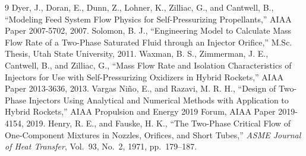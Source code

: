 \documentclass[11pt,a4paper]{article}
\begin{document}
\begin{thebibliography}{9}\footnotesize
{} Dyer, J., Doran, E., Dunn, Z., Lohner, K., Zilliac, G., and Cantwell, B., ``Modeling Feed System Flow Physics for Self-Pressurizing Propellants,'' AIAA Paper 2007-5702, 2007.
 Solomon, B. J., ``Engineering Model to Calculate Mass Flow Rate of a Two-Phase Saturated Fluid through an Injector Orifice,'' M.Sc. Thesis, Utah State University, 2011.
 Waxman, B. S., Zimmerman, J. E., Cantwell, B., and Zilliac, G., ``Mass Flow Rate and Isolation Characteristics of Injectors for Use with Self-Pressurizing Oxidizers in Hybrid Rockets,'' AIAA Paper 2013-3636, 2013.
 Vargas Ni\~no, E., and Razavi, M. R. H., ``Design of Two-Phase Injectors Using Analytical and Numerical Methods with Application to Hybrid Rockets,'' AIAA Propulsion and Energy 2019 Forum, AIAA Paper 2019-4154, 2019.
 Henry, R. E., and Fauske, H. K., ``The Two-Phase Critical Flow of One-Component Mixtures in Nozzles, Orifices, and Short Tubes,'' \emph{ASME Journal of Heat Transfer}, Vol.~93, No.~2, 1971, pp.~179--187.
\end{thebibliography}
\end{document}
